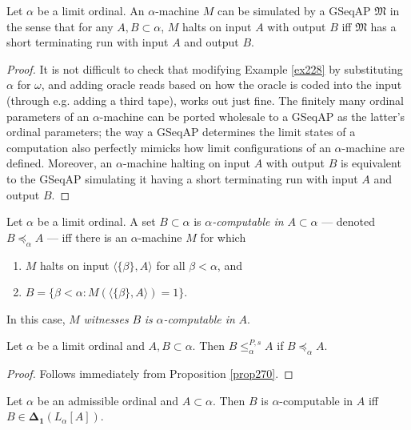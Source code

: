 \documentclass[12pt]{article}
\numberwithin{equation}{section}
\begin{document}
\begin{prop}\label{prop270}
Let $\alpha$ be a limit ordinal. An $\alpha$-machine $M$ can be simulated by a GSeqAP $\mathfrak{M}$ in the sense that for any $A, B \subset \alpha$, $M$ halts on input $A$ with output $B$ iff $\mathfrak{M}$ has a short terminating run with input $A$ and output $B$.
\end{prop}

\begin{proof}
It is not difficult to check that modifying Example \ref{ex228} by substituting $\alpha$ for $\omega$, and adding oracle reads based on how the oracle is coded into the input (through e.g. adding a third tape), works out just fine. The finitely many ordinal parameters of an $\alpha$-machine can be ported wholesale to a GSeqAP as the latter's ordinal parameters; the way a GSeqAP determines the limit states of a computation also perfectly mimicks how limit configurations of an $\alpha$-machine are defined. Moreover, an $\alpha$-machine halting on input $A$ with output $B$ is equivalent to the GSeqAP simulating it having a short terminating run with input $A$ and output $B$.
\end{proof}

\begin{defi}
Let $\alpha$ be a limit ordinal. A set $B \subset \alpha$ is $\alpha$\emph{-computable in} $A \subset \alpha$ --- denoted $B \preceq_{\alpha} A$ --- iff there is an $\alpha$-machine $M$ for which
\begin{enumerate}[label=(\alph*)]
    \item $M$ halts on input $\langle \{\beta\}, A \rangle$ for all $\beta < \alpha$, and
    \item $B = \{\beta < \alpha : M(\langle \{\beta\}, A \rangle) = 1\}$.
\end{enumerate}
In this case, $M$ \emph{witnesses} $B$ \emph{is} $\alpha$\emph{-computable in} $A$.
\end{defi}

\begin{cor}\label{cor334}
Let $\alpha$ be a limit ordinal and $A, B \subset \alpha$. Then $B \leq^{P, s}_{\alpha} A$ if $B \preceq_{\alpha} A$.
\end{cor}

\begin{proof}
Follows immediately from Proposition \ref{prop270}.
\end{proof}

\begin{fact}\label{fact334}
Let $\alpha$ be an admissible ordinal and $A \subset \alpha$. Then $B$ is $\alpha$-computable in $A$ iff $B \in \mathbf{\Delta_1}(L_{\alpha}[A])$.
\end{fact}
\end{document}
